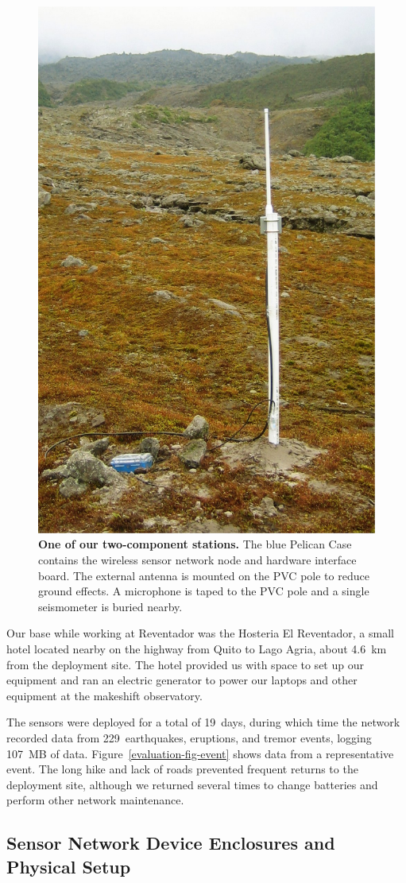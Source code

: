 \begin{figure}[t]
\begin{center}
\includegraphics[width=0.5\hsize]{./3-evaluation/figs/station.pdf}
\end{center}
\caption{\textbf{One of our two-component stations.} The blue Pelican Case
contains the wireless sensor network node and hardware interface board. The
external antenna is mounted on the PVC pole to reduce ground effects. A
microphone is taped to the PVC pole and a single seismometer is buried
nearby.}
\label{evaluation-fig-station}
\end{figure}

Our base while working at Reventador was the Hosteria El Reventador, a small
hotel located nearby on the highway from Quito to Lago Agria, about 4.6~km
from the deployment site. The hotel provided us with space to set up our
equipment and ran an electric generator to power our laptops and other
equipment at the makeshift observatory.

The sensors were deployed for a total of 19~days, during which time the
network recorded data from 229~earthquakes, eruptions, and tremor events,
logging 107~MB of data. Figure~\ref{evaluation-fig-event} shows data from
a representative event. The long hike and lack of roads prevented frequent
returns to the deployment site, although we returned several times to change
batteries and perform other network maintenance.

\subsection{Sensor Network Device Enclosures and Physical Setup}

